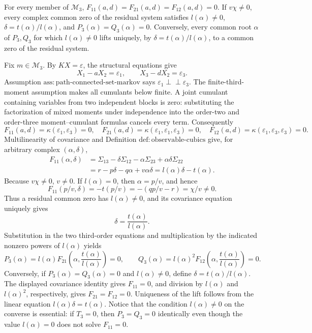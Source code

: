 For every member of \(\mathcal M_3\), \(F_{11}(a,d)=F_{21}(a,d)=F_{12}(a,d)=0\). If \(v\chi\neq0\), every complex common zero of the residual system satisfies \(l(\alpha)\neq0\), \(\delta=t(\alpha)/l(\alpha)\), and \(P_3(\alpha)=Q_3(\alpha)=0\). Conversely, every common root \(\alpha\) of \(P_3,Q_3\) for which \(l(\alpha)\neq0\) lifts uniquely, by \(\delta=t(\alpha)/l(\alpha)\), to a common zero of the residual system.

Fix \(m\in\mathcal M_3\). By \(KX=\varepsilon\), the structural equations give
\[
X_1-aX_2=\varepsilon _1,
\qquad
X_3-dX_2=\varepsilon _3.
\]
Assumption \(\mathrm{ass:path\mbox{-}connected\mbox{-}set\mbox{-}markov}\) says \(\varepsilon _1\perp\!\!\!\perp\varepsilon _3\). The finite-third-moment assumption makes all cumulants below finite. A joint cumulant containing variables from two independent blocks is zero: substituting the factorization of mixed moments under independence into the order-two and order-three moment--cumulant formulas cancels every term. Consequently
\[
F_{11}(a,d)=\kappa(\varepsilon _1,\varepsilon _3)=0,
\quad
F_{21}(a,d)=\kappa(\varepsilon _1,\varepsilon _1,\varepsilon _3)=0,
\quad
F_{12}(a,d)=\kappa(\varepsilon _1,\varepsilon _3,\varepsilon _3)=0.
\]
Multilinearity of covariance and Definition \(\mathrm{def:observable\mbox{-}cubics}\) give, for arbitrary complex \((\alpha,\delta)\),
\[
\begin{aligned}
F_{11}(\alpha,\delta)
 &=\Sigma_{13}-\delta\Sigma_{12}-\alpha\Sigma_{23}
     +\alpha\delta\Sigma_{22}\\
 &=r-p\delta-q\alpha+v\alpha\delta
   =l(\alpha)\delta-t(\alpha).
\end{aligned}
\]
Because \(v\chi\neq0\), \(v\neq0\). If \(l(\alpha)=0\), then \(\alpha=p/v\), and hence
\[
F_{11}(p/v,\delta)=-t(p/v)
=-\left(qp/v-r\right)=\chi/v\neq0.
\]
Thus a residual common zero has \(l(\alpha)\neq0\), and its covariance equation uniquely gives
\[
\delta=\frac{t(\alpha)}{l(\alpha)}.
\]
Substitution in the two third-order equations and multiplication by the indicated nonzero powers of \(l(\alpha)\) yields
\[
P_3(\alpha)=l(\alpha)F_{21}\!\left(\alpha,\frac{t(\alpha)}{l(\alpha)}\right)=0,
\qquad
Q_3(\alpha)=l(\alpha)^2F_{12}\!\left(\alpha,\frac{t(\alpha)}{l(\alpha)}\right)=0.
\]
Conversely, if \(P_3(\alpha)=Q_3(\alpha)=0\) and \(l(\alpha)\neq0\), define \(\delta=t(\alpha)/l(\alpha)\). The displayed covariance identity gives \(F_{11}=0\), and division by \(l(\alpha)\) and \(l(\alpha)^2\), respectively, gives \(F_{21}=F_{12}=0\). Uniqueness of the lift follows from the linear equation \(l(\alpha)\delta=t(\alpha)\). Notice that the condition \(l(\alpha)\neq0\) on the converse is essential: if \(T_3=0\), then \(P_3=Q_3=0\) identically even though the value \(l(\alpha)=0\) does not solve \(F_{11}=0\).

